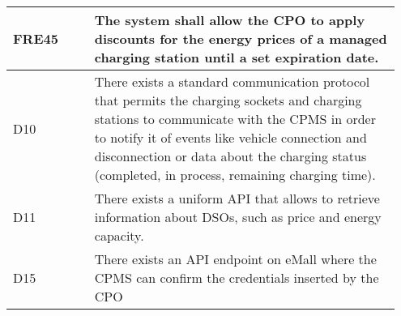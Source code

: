 {\begin{longtable}{|p{0.20\linewidth}p{0.75\linewidth} |}
    \hline
    \rowcolor{bluepoli!15} FRE45 &  The system shall allow the CPO to apply discounts for the energy prices of a managed charging station until a set expiration date.\\
    \hline
    \rowcolor{bluepoli!5} D10 & There exists a standard communication protocol that permits the charging sockets and charging stations to communicate with the CPMS in order to notify it of events like vehicle connection and disconnection or data about the charging status (completed, in process, remaining charging time).\\
    \hline    
    \rowcolor{bluepoli!5} D11 & There exists a uniform API that allows to retrieve information about DSOs, such as price and energy capacity. \\
    \hline
    \rowcolor{bluepoli!5} D15& There exists an API endpoint on eMall where the CPMS can confirm the credentials inserted by the CPO\\
    \hline
\end{longtable}}
